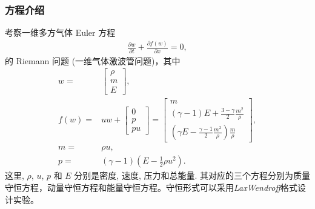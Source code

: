 \documentclass[10.5pt
]{article}
\begin{document}
\subsubsection{方程介绍}
考察一维多方气体 Euler 方程
\begin{align}
\frac{\partial w}{\partial t} + \frac{\partial f(w)}{\partial
x}= 0,\label{Eqn:Euler}
\end{align}
的 Riemann 问题 (一维气体激波管问题)，其中
\begin{align}
w =& \left[\begin{array}{c}
\rho\\
m\\
E
\end{array}\right],
\\
f(w) =& u w + \left[\begin{array}{c}
0\\
p\\
p u
\end{array}\right] = \left[\begin{array}{c}
m
\\
(\gamma - 1) E + \frac{3 - \gamma}{2} \frac{m^2}{\rho}
\\
(\gamma E - \frac{\gamma - 1}{2} \frac{m^2}{\rho}) \frac{m}{\rho}
\end{array}\right],
\\
m =& \rho u,
\\
p =& (\gamma - 1)(E - \frac{1}{2} \rho u^2).
\end{align}
这里, $\rho$, $u$, $p$ 和 $E$ 分别是密度, 速度, 压力和总能量. 其对应的三个方程分别为质量守恒方程，动量守恒方程和能量守恒方程。守恒形式可以采用\textit{LaxWendroff}格式设计实验。
\end{document}
